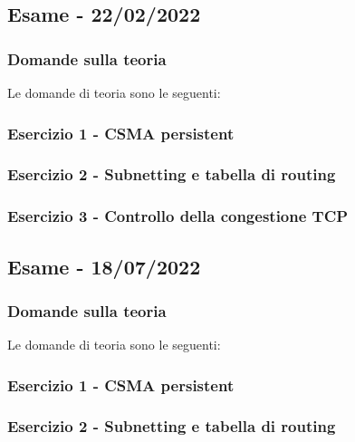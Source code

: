 \documentclass[a4paper]{article}
\begin{document}
	\newpage

	\subsection[\textbf{Esame - 22/02/2022}]{Esame - 22/02/2022}
	
	\subsubsection{Domande sulla teoria}
	Le domande di teoria sono le seguenti:
	
	\subsubsection{Esercizio 1 - CSMA persistent}
	
	\subsubsection{Esercizio 2 - Subnetting e tabella di routing}
	
	\subsubsection{Esercizio 3 - Controllo della congestione TCP}
	
	\newpage

	\subsection[\textbf{Esame - 18/07/2022}]{Esame - 18/07/2022}
	
	\subsubsection{Domande sulla teoria}
	Le domande di teoria sono le seguenti:
	
	\subsubsection{Esercizio 1 - CSMA persistent}
	
	\subsubsection{Esercizio 2 - Subnetting e tabella di routing}
	
\end{document}
